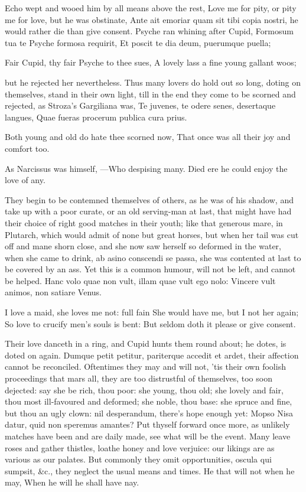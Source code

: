 {Echo wept and wooed him by all means above the rest, Love me for pity,
or pity me for love, but he was obstinate, Ante ait emoriar quam sit
tibi copia nostri, he would rather die than give consent. Psyche ran
whining after Cupid,
Formosum tua te Psyche formosa requirit,
Et poscit te dia deum, puerumque puella;

Fair Cupid, thy fair Psyche to thee sues,
A lovely lass a fine young gallant woos;

but he rejected her nevertheless. Thus many lovers do hold out so long,
doting on themselves, stand in their own light, till in the end they
come to be scorned and rejected, as Stroza's Gargiliana was,
Te juvenes, te odere senes, desertaque langues,
Quae fueras procerum publica cura prius.

Both young and old do hate thee scorned now,
That once was all their joy and comfort too.

As Narcissus was himself,
---Who despising many.
Died ere he could enjoy the love of any.

They begin to be contemned themselves of others, as he was of his
shadow, and take up with a poor curate, or an old serving-man at last,
that might have had their choice of right good matches in their youth;
like that generous mare, in Plutarch, which would admit of none
but great horses, but when her tail was cut off and mane shorn close,
and she now saw herself so deformed in the water, when she came to
drink, ab asino conscendi se passa, she was contented at last to be
covered by an ass. Yet this is a common humour, will not be left, and
cannot be helped.
Hanc volo quae non vult, illam quae vult ego nolo:
Vincere vult animos, non satiare Venus.

I love a maid, she loves me not: full fain
She would have me, but I not her again;
So love to crucify men's souls is bent:
But seldom doth it please or give consent.

Their love danceth in a ring, and Cupid hunts them round about; he
dotes, is doted on again. Dumque petit petitur, pariterque accedit et
ardet, their affection cannot be reconciled. Oftentimes they may and
will not, 'tis their own foolish proceedings that mars all, they are
too distrustful of themselves, too soon dejected: say she be rich, thou
poor: she young, thou old; she lovely and fair, thou most ill-favoured
and deformed; she noble, thou base: she spruce and fine, but thou an
ugly clown: nil desperandum, there's hope enough yet: Mopso Nisa datur,
quid non speremus amantes? Put thyself forward once more, as unlikely
matches have been and are daily made, see what will be the event. Many
leave roses and gather thistles, loathe honey and love verjuice: our
likings are as various as our palates. But commonly they omit
opportunities, oscula qui sumpsit, \&c., they neglect the usual means
and times.
He that will not when he may,
When he will he shall have nay.

}
